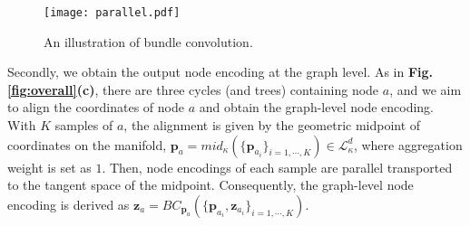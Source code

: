 \begin{figure}
    \centering
        \texttt{[image: parallel.pdf]}
                \vspace{-0.18in}
            \caption{An illustration of bundle convolution.}
        \label{fig:bundle}
            \vspace{-0.2in}
    \end{figure}

Secondly, we obtain the output node encoding at the graph level.
As in \textbf{Fig. \ref{fig:overall}(c)}, there are three cycles (and trees) containing node $a$, and we aim to align the coordinates of node $a$ and obtain the graph-level node encoding.
With $K$ samples of $a$, the alignment is given by the geometric midpoint of coordinates on the manifold, $\boldsymbol p_{a}=mid_\kappa(\{\boldsymbol p_{a_i}\}_{i=1,\cdots, K}) \in \mathcal L^d_\kappa$, where aggregation weight is set as $1$.
Then, 
node encodings of each sample are parallel transported to the tangent space of the midpoint.
Consequently, the graph-level node encoding is derived as $\boldsymbol z_{a}=BC_{\boldsymbol p_{a}}(\{\boldsymbol p_{a_i},\boldsymbol z_{a_i}\}_{i=1, \cdots, K})$.






